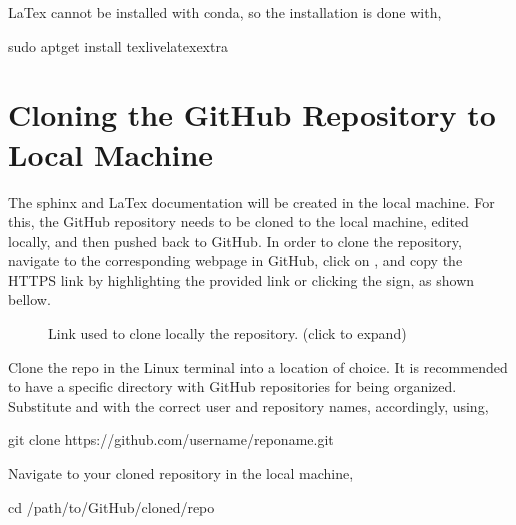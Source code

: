 \documentclass[letterpaper,10pt,english]{sphinxhowto}
\let\sphinxpxdimen\pdfpxdimen\else\newdimen\sphinxpxdimen
\begin{document}
LaTex cannot be installed with conda, so the installation is done with,

\begin{sphinxVerbatim}[commandchars=\\\{\}]
\PYGZdl{} sudo apt\PYGZhy{}get install texlive\PYGZhy{}latex\PYGZhy{}extra
\end{sphinxVerbatim}


\section{Cloning the GitHub Repository to Local Machine}
\label{\detokenize{index:cloning-the-github-repository-to-local-machine}}
The sphinx and LaTex documentation will be created in the local machine. For this, the GitHub repository needs to be cloned to the local machine, edited locally, and then pushed back to GitHub. In order to clone the repository, navigate to the corresponding webpage in GitHub, click on , and copy the HTTPS link by highlighting the provided link or clicking the  sign, as shown bellow.

\begin{figure}[htbp]
\centering
\capstart

\noindent\sphinxincludegraphics[width=600\sphinxpxdimen]{{github_repo_clone}.png}
\caption{Link used to clone locally the repository. (click to expand)}\label{\detokenize{index:id1}}\end{figure}

Clone the repo in the Linux terminal into a location of choice. It is recommended to have a specific directory with GitHub repositories for being organized. Substitute  and  with the correct user and repository names, accordingly, using,

\begin{sphinxVerbatim}[commandchars=\\\{\}]
\PYGZdl{} git clone https://github.com/\PYGZlt{}user\PYGZhy{}name\PYGZgt{}/\PYGZlt{}repo\PYGZhy{}name\PYGZgt{}.git
\end{sphinxVerbatim}

Navigate to your cloned repository in the local machine,

\begin{sphinxVerbatim}[commandchars=\\\{\}]
\PYGZdl{} cd /path/to/GitHub/cloned/repo
\end{sphinxVerbatim}
\end{document}
